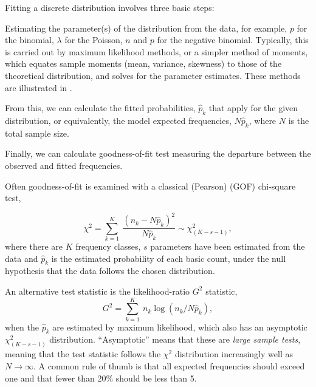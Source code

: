 \documentclass[11pt]{book}\usepackage[]{graphicx}\usepackage[]{color}
\begin{document}
Fitting a discrete distribution involves three basic steps:
\begin{enumerate*}

\item Estimating the parameter(s) of the distribution from the
data, for example, $p$ for the binomial, $\lambda$ for the
Poisson, $n$ and $p$ for the negative binomial. Typically,
this is carried out by maximum likelihood methods, or a simpler
method of moments, which equates sample moments (mean, variance, skewness) to those of the theoretical distribution, and solves
for the parameter estimates.  These methods are illustrated in .

\item  From this, we can calculate the fitted probabilities,
$\hat{p}_k$ that apply for the given distribution,
or equivalently, the model expected frequencies,
$N \hat{p}_k$, where $N$ is the total sample size.

\item Finally, we can calculate goodness-of-fit test
measuring the departure between the observed and
fitted frequencies.
\end{enumerate*}

Often goodness-of-fit is examined with a classical (Pearson)
 (GOF) chi-square test,

\begin{equation}\label{eq:chi2}
  \chi^2 = \sum_{k=1}^K \:
  \frac{{ ( n_k - N \hat{p}_k ) }^2}
  { N \hat{p}_k }  \sim \chi^2_{( K-s-1 )}
  \comma
\end{equation}
where there are $K$ frequency classes, 
$s$ parameters have been estimated from the data and
\(\hat{p}_k\) is the estimated probability of each basic count,
under the null hypothesis that the data follows the chosen distribution.

An alternative test statistic is the likelihood-ratio $G^2$
statistic,
\begin{equation}\label{eq:g2}
 G^2 = \sum_{k=1}^K \: n_k \log ( n_k / N \hat{p}_k )
 \comma
\end{equation}
when the $\hat{p}_k$ are estimated by maximum likelihood,
which also has an asymptotic $\chi^2_{(K - s - 1)}$ distribution.
``Asymptotic'' means that these are \emph{large sample tests},
meaning that the test statistic follows the $\chi^2$ distribution
increasingly well as $N \rightarrow \infty$.
A common rule of thumb is that all expected frequencies
should exceed one and that fewer than 20\% should be less than 5.
\end{document}
